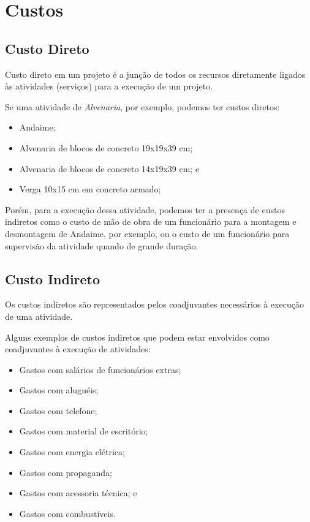 \chapter{Custos}

\section{Custo Direto}

Custo direto em um projeto é a junção de todos os recursos diretamente ligados às atividades (serviços) para a execução de um projeto.

Se uma atividade de \emph{Alvenaria}, por exemplo, podemos ter custos diretos:

\begin{itemize}
	\item Andaime;
	\item Alvenaria de blocos de concreto 19x19x39 cm;
	\item Alvenaria de blocos de concreto 14x19x39 cm; e
	\item Verga 10x15 cm em concreto armado;
\end{itemize}

Porém, para a execução dessa atividade, podemos ter a presença de custos indiretos como o custo de mão de obra de um funcionário para a montagem e desmontagem de Andaime, por exemplo, ou o custo de um funcionário para supervisão da atividade quando de grande duração.

\section{Custo Indireto}

Os custos indiretos são representados pelos coadjuvantes necessários à execução de uma atividade.

Alguns exemplos de custos indiretos que podem estar envolvidos como coadjuvantes à execução de atividades:

\begin{itemize}
	\item Gastos com salários de funcionários extras;
	\item Gastos com aluguéis;
	\item Gastos com telefone;
	\item Gastos com material de escritório;
	\item Gastos com energia elétrica;
	\item Gastos com propaganda;
	\item Gastos com acessoria técnica; e
	\item Gastos com combustíveis.
\end{itemize}
